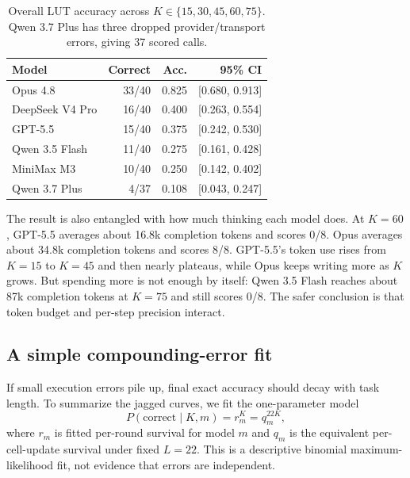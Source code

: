 \documentclass[10pt,twocolumn]{article}
\begin{document}
\begin{table}[t]
\centering
\small
\begin{tabular}{lrrr}
\toprule
Model & Correct & Acc. & 95\% CI \\
\midrule
Opus 4.8 & 33/40 & 0.825 & [0.680, 0.913] \\
DeepSeek V4 Pro & 16/40 & 0.400 & [0.263, 0.554] \\
GPT-5.5 & 15/40 & 0.375 & [0.242, 0.530] \\
Qwen 3.5 Flash & 11/40 & 0.275 & [0.161, 0.428] \\
MiniMax M3 & 10/40 & 0.250 & [0.142, 0.402] \\
Qwen 3.7 Plus & 4/37 & 0.108 & [0.043, 0.247] \\
\bottomrule
\end{tabular}
\caption{Overall LUT accuracy across $K\in\{15,30,45,60,75\}$. Qwen 3.7 Plus has three dropped provider/transport errors, giving 37 scored calls.}
\label{tab:lut}
\end{table}

The result is also entangled with how much thinking each model does. At $K=60$, GPT-5.5 averages about 16.8k completion tokens and scores 0/8. Opus averages about 34.8k completion tokens and scores 8/8. GPT-5.5's token use rises from $K=15$ to $K=45$ and then nearly plateaus, while Opus keeps writing more as $K$ grows. But spending more is not enough by itself: Qwen 3.5 Flash reaches about 87k completion tokens at $K=75$ and still scores 0/8. The safer conclusion is that token budget and per-step precision interact.

\subsection{A simple compounding-error fit}
If small execution errors pile up, final exact accuracy should decay with task length. To summarize the jagged curves, we fit the one-parameter model
\[
    P(\text{correct}\mid K,m) = r_m^K = q_m^{22K},
\]
where $r_m$ is fitted per-round survival for model $m$ and $q_m$ is the equivalent per-cell-update survival under fixed $L=22$. This is a descriptive binomial maximum-likelihood fit, not evidence that errors are independent.
\end{document}
